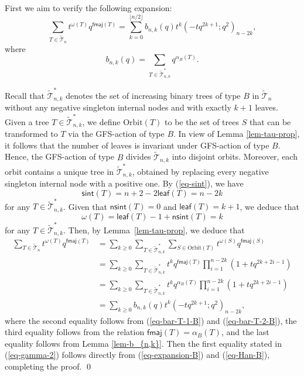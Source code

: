 \documentclass[12pt]{article}
\numberwithin{equation}{section}
\theoremstyle{plain}
\def\fmaj{\mathsf{fmaj}}
\def\sint{\mathsf{sint}}
\def\nsint{\mathsf{nsint}}
\def\B{\mathcal{T}}
\def\leaf{\mathsf{leaf}}
\begin{document}
	 				 	
	 				 	 First we aim to verify the following expansion:
	 				 	\begin{equation}\label{eq-expansion-B}
	 				 		\sum\limits_{T\in \widetilde{\B}_n}t^{\omega(T)}q^{\fmaj(T)}=\sum\limits_{k=0}^{\lfloor {n/2}\rfloor}  
	 				 		b_{n, k}(q)t^{k}(-tq^{2k+1}; q^2)_{n-2k},
	 				 		\end{equation}
	 				 		where 
	 				 		$$
	 				 		b_{n,k}(q)=\sum_{T\in \widetilde{\B}^*_{n,k}}q^{\alpha_B(T)}.
	 				 		$$
	 				 		
	 				 		
	 				 		Recall that $\widetilde{\B}^*_{n,k}$ denotes the set of increasing binary trees of type $B$ in $\widetilde{\B}_n$ without any negative  singleton internal nodes and with exactly $k+1$ leaves.
	 				 		Given a tree  $T\in \widetilde{\B}^*_{n,k}$, we define  $\mathrm{Orbit}(T)$ to be the set of trees $S$ that can be transformed
	 				 		to $T$ via the GFS-action  of type $B$.  
	 				 	 In view of Lemma \ref{lem-tau-prop}, it follows that  the number of  leaves is invariant  under GFS-action  of type $B$.  Hence, the GFS-action of type $B$
	 				 	divides $\widetilde{\B}_{n,k}$ into disjoint orbits. 
	 				 	Moreover, each orbit contains a unique tree in $\widetilde{\B}^*_{n,k}$, obtained by replacing every negative singleton internal node with a positive one.
	 				 	By (\ref{eq-sint}),  we have
	 				 	\begin{equation}\label{eq-bar-T-1-B}
	 				 		\sint(T)=n+2-2\leaf(T)=n-2k
	 				 	\end{equation}
	 				 	for any $T\in \widetilde{\B}^*_{n,k}$.
	 				 	Given that  $\nsint(T)=0$ and $\leaf(T)=k+1$, we deduce that
	 				 	 	\begin{equation}\label{eq-bar-T-2-B}
	 				 	 	\omega(T)=\leaf(T)-1+\nsint(T)=k
	 				 	 \end{equation}
	 				 	for any $T\in \widetilde{\B}^*_{n,k}$.
	 				 	Then, by Lemma~\ref{lem-tau-prop}, we deduce that
	 				 		\[
	 				 	\begin{aligned}
	 				 		\sum\limits_{T\in \widetilde{\B}_n}t^{\omega(T)}q^{\fmaj(T)}
	 				 		&= \sum_{k\geq 0}\sum_{T\in\widetilde{\B}^*_{n,k} }\sum_{S\in \mathrm{Orbit}(T)} t^{\omega(S)}q^{\fmaj(S)}\\
	 				 		&= \sum_{k\geq 0}\sum_{T\in\widetilde{\B}^*_{n,k} }t^{k}q^{\fmaj(T)}\prod\limits_{i=1}^{n-2k}(1+tq^{2k+2i-1})\\
	 				 		&= \sum_{k\geq 0}\sum_{T\in\widetilde{\B}^*_{n,k} }t^{k}q^{\alpha_B(T)}\prod\limits_{i=1}^{n-2k}(1+tq^{2k+2i-1})\\
	 				 		&=  \sum_{k\geq 0} b_{n,k}(q)t^{k}(-tq^{2k+1}; q^2)_{n-2k},
	 				 	\end{aligned}
	 				 	\]
	 				 	where the second equality follows from (\ref{eq-bar-T-1-B}) and (\ref{eq-bar-T-2-B}), the third equality follows from    the relation $\fmaj(T)=\alpha_B(T)$, and 
	 			the last equality follows from Lemma \ref{lem-b_{n,k}}. 
	 				 	Then the first equality stated in (\ref{eq-gamma-2})  follows directly from (\ref{eq-expansion-B}) and  (\ref{eq-Han-B}), completing the proof. \qed
	 				 	
\end{document}
